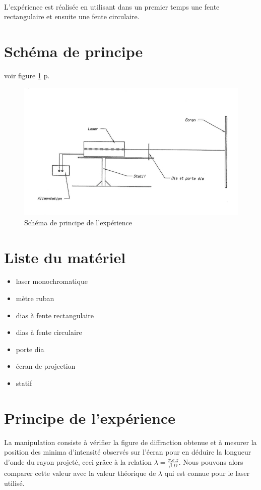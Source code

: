 \documentclass[11pt,a4paper]{report}
\begin{document}
\paragraph{}
L'expérience est réalisée en utilisant dans un premier temps une fente rectangulaire et ensuite une fente circulaire.


	\section{Schéma de principe}
	voir figure \ref{schemadeprincipe} p.\pageref{schemadeprincipe}
	\begin{figure}[!]
	\caption{\label{schemadeprincipe} Schéma de principe de l'expérience}
	\includegraphics[scale=0.5]{schemadeprincipe.jpg}
	\end{figure}
	\section{Liste du matériel}
	\begin{itemize}
	\item laser monochromatique
	\item mètre ruban
	\item dias à fente rectangulaire
	\item dias à fente circulaire
	\item porte dia
	\item écran de projection
	\item statif
	\end{itemize}
	\section{Principe de l'expérience}
	La manipulation consiste à vérifier la figure de diffraction obtenue et à mesurer la position des minima d'intensité observés sur l'écran pour en déduire la longueur d'onde du rayon projeté, ceci grâce à la relation  
	$\lambda = \frac{\pi.e.z}{\beta.D}$. Nous pouvons alors comparer cette valeur avec la valeur théorique de $\lambda$ qui est connue pour le laser utilisé.
\end{document}
